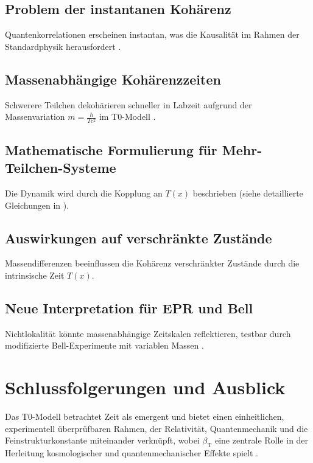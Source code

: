 \documentclass[12pt,a4paper]{article}
\newcommand{\Tfield}{T(x)}
\newcommand{\betaT}{\beta_{\text{T}}}
\begin{document}
	\subsection{Problem der instantanen Kohärenz}
	Quantenkorrelationen erscheinen instantan, was die Kausalität im Rahmen der Standardphysik herausfordert \cite{bell}.
	
	\subsection{Massenabhängige Kohärenzzeiten}
	Schwerere Teilchen dekohärieren schneller in Labzeit aufgrund der Massenvariation \( m = \frac{\hbar}{T c^2} \) im T0-Modell \cite{pascher_galaxies_2025}.
	
	\subsection{Mathematische Formulierung für Mehr-Teilchen-Systeme}
	Die Dynamik wird durch die Kopplung an \(\Tfield\) beschrieben (siehe detaillierte Gleichungen in \cite{pascher_lagrange_2025}).
	
	\subsection{Auswirkungen auf verschränkte Zustände}
	Massendifferenzen beeinflussen die Kohärenz verschränkter Zustände durch die intrinsische Zeit \(\Tfield\).
	
	\subsection{Neue Interpretation für EPR und Bell}
	Nichtlokalität könnte massenabhängige Zeitskalen reflektieren, testbar durch modifizierte Bell-Experimente mit variablen Massen \cite{bell}.
	
	\section{Schlussfolgerungen und Ausblick}
	Das T0-Modell betrachtet Zeit als emergent und bietet einen einheitlichen, experimentell überprüfbaren Rahmen, der Relativität, Quantenmechanik und die Feinstrukturkonstante miteinander verknüpft, wobei \(\betaT\) eine zentrale Rolle in der Herleitung kosmologischer und quantenmechanischer Effekte spielt \cite{pascher_galaxies_2025, pascher_alphabeta_2025}.
	
\end{document}
